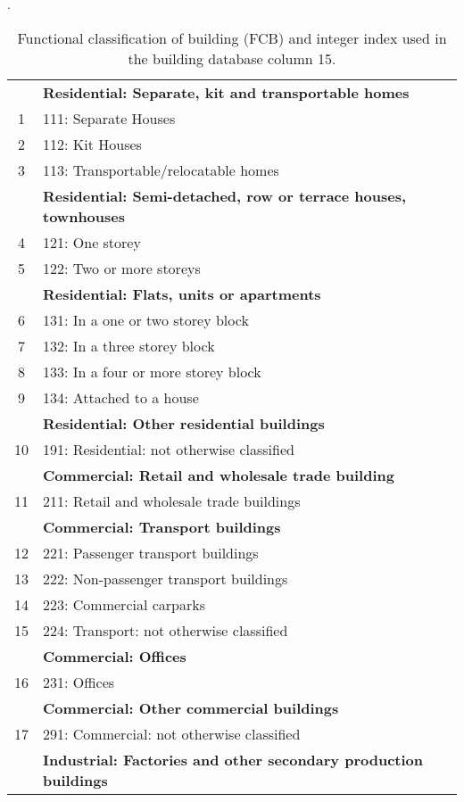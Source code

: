 \begin{table}
\centering \caption{Functional classification of building
(FCB) \citep{dr_ABS01a} and integer
index used in the building database
column 15.} \vspace{0.8em} \label{tab:grids-FCB}  {\footnotesize .
\begin{tabular}{|c|p{}|}
 \hline
& \textbf{Residential: Separate, kit and transportable homes} \\
1 & 111: Separate Houses\\
2 & 112: Kit Houses\\
3 & 113: Transportable/relocatable homes\\
& \textbf{Residential: Semi-detached, row or terrace houses, townhouses}  \\
4 & 121: One storey\\
5 & 122: Two or more storeys\\
& \textbf{Residential: Flats, units or apartments} \\
6 & 131:  In a one or two storey block\\
7 & 132: In a three storey block\\
8 & 133:  In a four or more storey block\\
9 & 134:  Attached to a house\\
& \textbf{Residential: Other residential buildings} \\
10 & 191:  Residential: not otherwise classified \\
\hline
& \textbf{Commercial: Retail and wholesale trade building} \\
11 & 211:  Retail and wholesale trade buildings \\
& \textbf{Commercial: Transport buildings} \\
12 & 221:  Passenger transport buildings\\
13 & 222:  Non-passenger transport buildings\\
14 & 223:  Commercial carparks\\
15 & 224:  Transport: not otherwise classified\\
& \textbf{Commercial: Offices} \\
16 & 231:  Offices \\
& \textbf{Commercial: Other commercial buildings} \\
17 & 291:  Commercial: not otherwise classified\\
& \textbf{Industrial: Factories and other secondary production buildings} \\

\end{tabular}}
\end{table}
